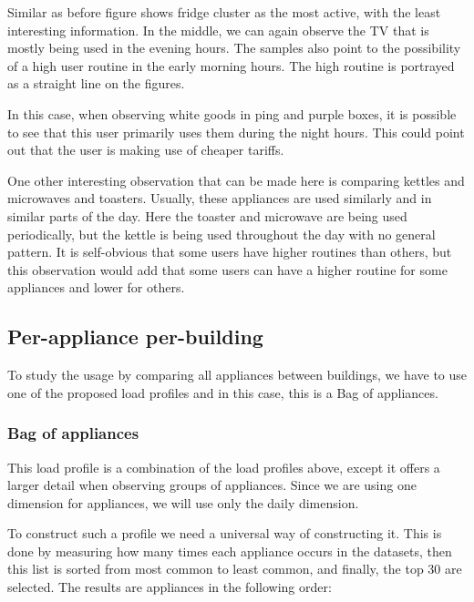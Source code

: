 Similar as before figure \label{fig:tsne_papb_img_scatter_ent_refit8} shows fridge cluster as the most active,
with the least interesting information. In the middle, we can again observe the TV that is mostly being used
in the evening hours. The samples also point to the possibility of a high user routine in the early morning hours.
The high routine is portrayed as a straight line on the figures. 

In this case, when observing white goods in ping and purple boxes, it is possible to see that this user primarily uses them during the night hours.
This could point out that the user is making use of cheaper tariffs.

One other interesting observation that can be made here is comparing kettles and microwaves and toasters.
Usually, these appliances are used similarly and in similar parts of the day. 
Here the toaster and microwave are being used periodically, but the kettle is being used throughout the day with no general pattern.
It is self-obvious that some users have higher routines than others, but this observation
would add that some users can have a higher routine for some appliances and lower for others. 

\subsection{Per-appliance per-building}

To study the usage by comparing all appliances between buildings,
we have to use one of the proposed load profiles and in this case, this is a Bag of appliances.

\subsubsection{Bag of appliances}
This load profile is a combination of the load profiles above,
except it offers a larger detail when observing groups of appliances.
Since we are using one dimension for appliances, we will use only the daily dimension.

To construct such a profile we need a universal way of constructing it.
This is done by measuring how many times each appliance occurs in the datasets,
then this list is sorted from most common to least common, and finally, the top 30 are selected.
The results are appliances in the following order:

